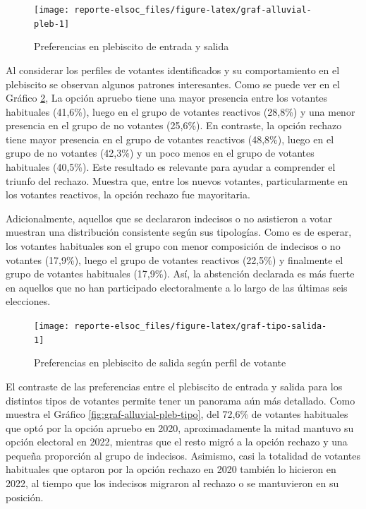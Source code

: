 \documentclass[
  12pt,
]{book}
\begin{document}
\begin{figure}

{\centering \texttt{[image: reporte-elsoc\_files/figure-latex/graf-alluvial-pleb-1]} 

}

\caption{Preferencias en plebiscito de entrada y salida}\label{fig:graf-alluvial-pleb}
\end{figure}

Al considerar los perfiles de votantes identificados y su comportamiento en el plebiscito se observan algunos patrones interesantes. Como se puede ver en el Gráfico \ref{fig:graf-tipo-salida}, La opción apruebo tiene una mayor presencia entre los votantes habituales (41,6\%), luego en el grupo de votantes reactivos (28,8\%) y una menor presencia en el grupo de no votantes (25,6\%). En contraste, la opción rechazo tiene mayor presencia en el grupo de votantes reactivos (48,8\%), luego en el grupo de no votantes (42,3\%) y un poco menos en el grupo de votantes habituales (40,5\%). Este resultado es relevante para ayudar a comprender el triunfo del rechazo. Muestra que, entre los nuevos votantes, particularmente en los votantes reactivos, la opción rechazo fue mayoritaria.

Adicionalmente, aquellos que se declararon indecisos o no asistieron a votar muestran una distribución consistente según sus tipologías. Como es de esperar, los votantes habituales son el grupo con menor composición de indecisos o no votantes (17,9\%), luego el grupo de votantes reactivos (22,5\%) y finalmente el grupo de votantes habituales (17,9\%). Así, la abstención declarada es más fuerte en aquellos que no han participado electoralmente a lo largo de las últimas seis elecciones.

\begin{figure}

{\centering \texttt{[image: reporte-elsoc\_files/figure-latex/graf-tipo-salida-1]} 

}

\caption{Preferencias en plebiscito de salida según perfil de votante}\label{fig:graf-tipo-salida}
\end{figure}

El contraste de las preferencias entre el plebiscito de entrada y salida para los distintos tipos de votantes permite tener un panorama aún más detallado. Como muestra el Gráfico \ref{fig:graf-alluvial-pleb-tipo}, del 72,6\% de votantes habituales que optó por la opción apruebo en 2020, aproximadamente la mitad mantuvo su opción electoral en 2022, mientras que el resto migró a la opción rechazo y una pequeña proporción al grupo de indecisos. Asimismo, casi la totalidad de votantes habituales que optaron por la opción rechazo en 2020 también lo hicieron en 2022, al tiempo que los indecisos migraron al rechazo o se mantuvieron en su posición.
\end{document}

